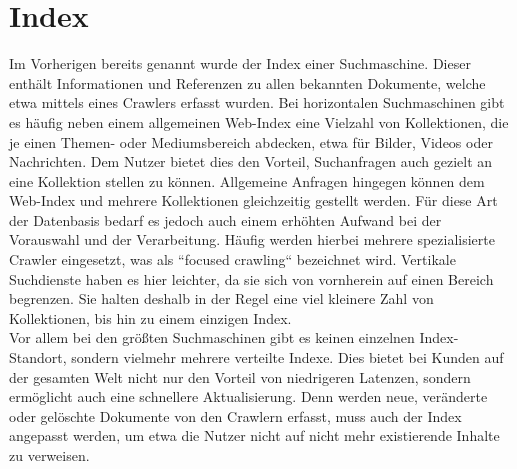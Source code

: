 \section{Index}
\label{sec:Index}
Im Vorherigen bereits genannt wurde der Index einer Suchmaschine. Dieser enthält Informationen und Referenzen zu allen bekannten Dokumente, welche etwa mittels eines Crawlers erfasst wurden. Bei horizontalen Suchmaschinen gibt es häufig neben einem allgemeinen Web-Index eine Vielzahl von Kollektionen, die je einen Themen- oder Mediumsbereich abdecken, etwa für Bilder, Videos oder Nachrichten. Dem Nutzer bietet dies den Vorteil, Suchanfragen auch gezielt an eine Kollektion stellen zu können. Allgemeine Anfragen hingegen können dem Web-Index und mehrere Kollektionen gleichzeitig gestellt werden. Für diese Art der Datenbasis bedarf es jedoch auch einem erhöhten Aufwand bei der Vorauswahl und der Verarbeitung. Häufig werden hierbei mehrere spezialisierte Crawler eingesetzt, was als ``focused crawling`` bezeichnet wird. Vertikale Suchdienste haben es hier leichter, da sie sich von vornherein auf einen Bereich begrenzen. Sie halten deshalb in der Regel eine viel kleinere Zahl von Kollektionen, bis hin zu einem einzigen Index.\\
Vor allem bei den größten Suchmaschinen gibt es keinen einzelnen Index-Standort, sondern vielmehr mehrere verteilte Indexe. Dies bietet bei Kunden auf der gesamten Welt nicht nur den Vorteil von niedrigeren Latenzen, sondern ermöglicht auch eine schnellere Aktualisierung. Denn werden neue, veränderte oder gelöschte Dokumente von den Crawlern erfasst, muss auch der Index angepasst werden, um etwa die Nutzer nicht auf nicht mehr existierende Inhalte zu verweisen.

